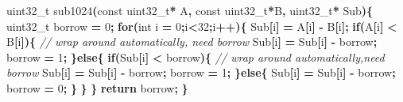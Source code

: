 \documentclass[11pt,a4paper]{ctexart}
\newenvironment{Shaded}{\begin{snugshade}}{\end{snugshade}}
\newcommand{\CommentTok}[1]{\textcolor[rgb]{0.56,0.35,0.01}{\textit{#1}}}
\newcommand{\ControlFlowTok}[1]{\textcolor[rgb]{0.13,0.29,0.53}{\textbf{#1}}}
\newcommand{\DataTypeTok}[1]{\textcolor[rgb]{0.13,0.29,0.53}{#1}}
\newcommand{\DecValTok}[1]{\textcolor[rgb]{0.00,0.00,0.81}{#1}}
\newcommand{\NormalTok}[1]{#1}
\newcommand{\OperatorTok}[1]{\textcolor[rgb]{0.81,0.36,0.00}{\textbf{#1}}}
\renewenvironment{Shaded}{\begin{snugshade}}{\end{snugshade}}
\begin{document}
\begin{Shaded}
\begin{Highlighting}[]
\DataTypeTok{uint32\_t}\NormalTok{ sub1024}\OperatorTok{(}\DataTypeTok{const} \DataTypeTok{uint32\_t}\OperatorTok{*}\NormalTok{ A}\OperatorTok{,} \DataTypeTok{const} \DataTypeTok{uint32\_t}\OperatorTok{*}\NormalTok{B}\OperatorTok{,} \DataTypeTok{uint32\_t}\OperatorTok{*}\NormalTok{ Sub}\OperatorTok{)\{}
    \DataTypeTok{uint32\_t}\NormalTok{ borrow }\OperatorTok{=} \DecValTok{0}\OperatorTok{;}
    \ControlFlowTok{for}\OperatorTok{(}\DataTypeTok{int}\NormalTok{ i }\OperatorTok{=} \DecValTok{0}\OperatorTok{;}\NormalTok{i}\OperatorTok{\textless{}}\DecValTok{32}\OperatorTok{;}\NormalTok{i}\OperatorTok{++)\{}
\NormalTok{        Sub}\OperatorTok{[}\NormalTok{i}\OperatorTok{]} \OperatorTok{=}\NormalTok{ A}\OperatorTok{[}\NormalTok{i}\OperatorTok{]} \OperatorTok{{-}}\NormalTok{ B}\OperatorTok{[}\NormalTok{i}\OperatorTok{];}
        \ControlFlowTok{if}\OperatorTok{(}\NormalTok{A}\OperatorTok{[}\NormalTok{i}\OperatorTok{]} \OperatorTok{\textless{}}\NormalTok{ B}\OperatorTok{[}\NormalTok{i}\OperatorTok{])\{} \CommentTok{// wrap around automatically, need borrow}
\NormalTok{            Sub}\OperatorTok{[}\NormalTok{i}\OperatorTok{]} \OperatorTok{=}\NormalTok{ Sub}\OperatorTok{[}\NormalTok{i}\OperatorTok{]} \OperatorTok{{-}}\NormalTok{ borrow}\OperatorTok{;}
\NormalTok{            borrow }\OperatorTok{=} \DecValTok{1}\OperatorTok{;}
        \OperatorTok{\}}\ControlFlowTok{else}\OperatorTok{\{}
            \ControlFlowTok{if}\OperatorTok{(}\NormalTok{Sub}\OperatorTok{[}\NormalTok{i}\OperatorTok{]} \OperatorTok{\textless{}}\NormalTok{ borrow}\OperatorTok{)\{} \CommentTok{// wrap around automatically,need borrow}
\NormalTok{                Sub}\OperatorTok{[}\NormalTok{i}\OperatorTok{]} \OperatorTok{=}\NormalTok{ Sub}\OperatorTok{[}\NormalTok{i}\OperatorTok{]} \OperatorTok{{-}}\NormalTok{ borrow}\OperatorTok{;}
\NormalTok{                borrow }\OperatorTok{=} \DecValTok{1}\OperatorTok{;}
            \OperatorTok{\}}\ControlFlowTok{else}\OperatorTok{\{}
\NormalTok{                Sub}\OperatorTok{[}\NormalTok{i}\OperatorTok{]} \OperatorTok{=}\NormalTok{ Sub}\OperatorTok{[}\NormalTok{i}\OperatorTok{]} \OperatorTok{{-}}\NormalTok{ borrow}\OperatorTok{;}
\NormalTok{                borrow }\OperatorTok{=} \DecValTok{0}\OperatorTok{;}
            \OperatorTok{\}}
        \OperatorTok{\}}
    \OperatorTok{\}}
    \ControlFlowTok{return}\NormalTok{ borrow}\OperatorTok{;}
\OperatorTok{\}}
\end{Highlighting}
\end{Shaded}
\end{document}
